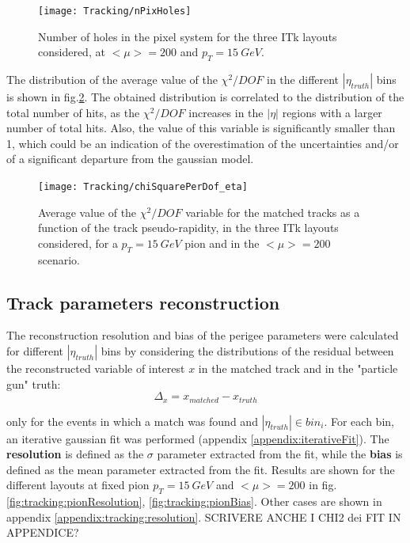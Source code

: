 \documentclass[a4paper,twoside,12pt]{article}
\begin{document}
\begin{figure}
\centering
\texttt{[image: Tracking/nPixHoles]}
\caption{Number of holes in the pixel system for the three ITk layouts considered, at $<\mu> = 200$ and $p_{T} = 15\ GeV$.}
\label{fig:tracking:nHoles}
\end{figure}

The distribution of the average value of the $\chi^{2}/DOF$ in the different $|\eta_{truth}|$ bins is shown in fig.\ref{fig:tracking:chiSqPerDof_eta}. The obtained distribution 
is correlated to the distribution of the total number of hits, as the $\chi^{2}/DOF$ increases in the $|\eta|$ regions with a larger number of total hits. Also, the value of this variable
is significantly smaller than 1, which could be an indication of the overestimation of the uncertainties and/or of a significant departure from the gaussian model.

\begin{figure}
\centering
\texttt{[image: Tracking/chiSquarePerDof\_eta]}
\caption{Average value of the $\chi^{2}/DOF$ variable for the matched tracks as a function of the track pseudo-rapidity, in the three ITk layouts considered, for a $p_{T} = 15\ GeV$ pion
and in the $<\mu> = 200$ scenario.}
\label{fig:tracking:chiSqPerDof_eta}
\end{figure}

\subsection{Track parameters reconstruction}\label{sec:tracking:resolution}
The reconstruction resolution and bias of the perigee parameters were calculated for different $|\eta_{truth}|$ bins by considering the distributions of the residual between the reconstructed
variable of interest $x$ in the matched track and in the "particle gun" truth:\\
$$
\Delta_{x} = x_{matched} - x_{truth}
$$

only for the events in which a match was found and $|\eta_{truth}| \in bin_{i}$. For each bin, an iterative gaussian fit was performed (appendix \ref{appendix:iterativeFit}). The \textbf{resolution}
is defined as the $\sigma$ parameter extracted from the fit, while the \textbf{bias} is defined as the mean parameter extracted from the fit. Results are shown for the different layouts at
fixed pion $p_{T} = 15\ GeV$ and $<\mu> = 200$ in fig.\ref{fig:tracking:pionResolution}, \ref{fig:tracking:pionBias}. Other cases are shown in appendix \ref{appendix:tracking:resolution}. SCRIVERE ANCHE I CHI2 dei FIT IN APPENDICE?\\
\end{document}
